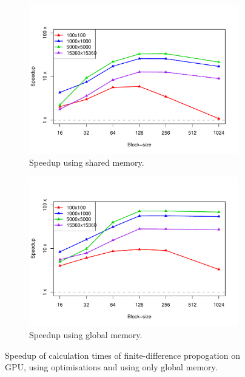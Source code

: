 \documentclass[12pt]{article}
\begin{document}
\begin{figure}
	\centering
	\begin{subfigure}{0.48\linewidth}
		\centering
		\includegraphics[width=0.85\linewidth]{../plots/fdcalc_shared.pdf}
		\caption{Speedup using shared memory.}
		\label{fig:1}
	\end{subfigure}\hfill
	\begin{subfigure}{0.48\linewidth}
		\centering
		\includegraphics[width=0.85\linewidth]{../plots/fdcalc_glob.pdf}
		\caption{Speedup using global memory.}
		\label{fig:2}
	\end{subfigure}
	\caption{Speedup of calculation times of finite-difference propogation on GPU, using optimisations and using only global memory.}
\end{figure}
\end{document}
